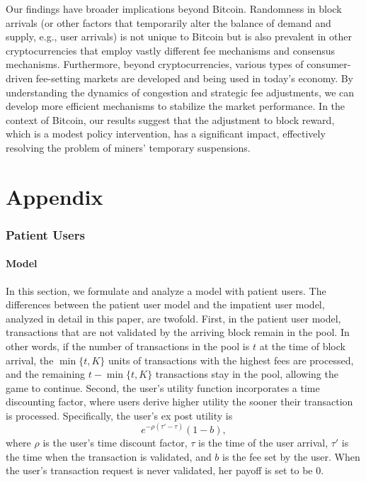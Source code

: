 \documentclass[12pt, letterpaper]{article}
\begin{document}
Our findings have broader implications beyond Bitcoin. Randomness in block arrivals (or other factors that temporarily alter the balance of demand and supply, e.g., user arrivals) is not unique to Bitcoin but is also prevalent in other cryptocurrencies that employ vastly different fee mechanisms and consensus mechanisms. Furthermore, beyond cryptocurrencies, various types of consumer-driven fee-setting markets are developed and being used in today's economy. By understanding the dynamics of congestion and strategic fee adjustments, we can develop more efficient mechanisms to stabilize the market performance. In the context of Bitcoin, our results suggest that the adjustment to block reward, which is a modest policy intervention, has a significant impact, effectively resolving the problem of miners' temporary suspensions.





\appendix

\part*{Appendix}


\section{Patient Users}\label{sec: appendix patient users}

\subsection{Model}

In this section, we formulate and analyze a model with patient users. The differences between the patient user model and the impatient user model, analyzed in detail in this paper, are twofold. First, in the patient user model, transactions that are not validated by the arriving block remain in the pool. In other words, if the number of transactions in the pool is $t$ at the time of block arrival, the $\min\{t, K\}$ units of transactions with the highest fees are processed, and the remaining $t - \min\{t, K\}$ transactions stay in the pool, allowing the game to continue. Second, the user's utility function incorporates a time discounting factor, where users derive higher utility the sooner their transaction is processed. Specifically, the user's ex post utility is
\begin{equation}\label{eq: impatient user model ex post payoff}
    e^{- \rho (\tau' - \tau)}(1 - b),
\end{equation}
where $\rho$ is the user's time discount factor, $\tau$ is the time of the user arrival, $\tau'$ is the time when the transaction is validated, and $b$ is the fee set by the user.
When the user's transaction request is never validated, her payoff is set to be $0$.
\end{document}
